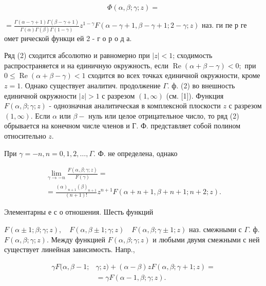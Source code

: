 \documentclass[10pt]{article}
\begin{document}
\[

\Phi(\alpha, \beta ; \gamma ; z)=

\]



$=\frac{\Gamma(\alpha-\gamma+1) \Gamma(\beta-\gamma+1)}{\Gamma(\alpha) \Gamma(\beta) \Gamma(1-\gamma)} z^{1-\gamma} F(\alpha-\gamma+1, \beta-\gamma+1 ; 2-\gamma ; z)$ наз. ги пе р ге омет рической функци ей 2 - г о р о д а.



Ряд (2) сходится абсолютно и равномерно при $|z|<1$; сходимость распространяется и на единичную окружность, если $\operatorname{Re}(\alpha+\beta-\gamma)<0 ;$ при $0 \leqslant \operatorname{Re}(\alpha+\beta-\gamma)<1$ сходится во всех точках единичной окружности, кроме $z=1$. Однако существует аналитич. продолжение $\Gamma$. ф. (2) во внешность единичной окружности $|z|>1$ с разрезом $(1, \infty)$ (см. [1]). Функция $F(\alpha, \beta ; \gamma ; z)$ - однозначная аналитическая в комплексной плоскости $z$ с разрезом $(1, \infty)$. Если $\alpha$ или $\beta-$ нуль или целое отрицательное число, то ряд (2) обрывается на конечном числе членов и Г. Ф. представляет собой полином относительно $z$.



При $\gamma=-n, n=0,1,2, \ldots, \Gamma$. Ф. не определена, однако



\[

\begin{gathered}

\lim _{\gamma \rightarrow-n} \frac{F(\alpha, \beta ; \gamma ; z)}{F(\gamma)}= \\

=\frac{(\alpha)_{n+1}(\beta)_{n+1}}{(n+1) !} z^{n+1} F(\alpha+n+1, \beta+n+1 ; n+2 ; z) .

\end{gathered}

\]



Элементарны е с о отношения. Шесть функций



$F(\alpha \pm 1 ; \beta ; \gamma ; z), \quad F(\alpha, \beta \pm 1 ; \gamma ; z) \quad F(\alpha, \beta ; \gamma \pm 1 ; z)$ наз. смежными с $\Gamma$. ф. $F(\alpha, \beta ; \gamma ; z)$. Между функцией $F(\alpha, \beta ; \gamma ; z)$ и любыми двумя смежными с ней существует линейная зависимость. Напр.,



\[

\begin{aligned}

\gamma F(\alpha, \beta-1 ; & \gamma ; z)+(\alpha-\beta) z F(\alpha, \beta ; \gamma+1 ; z)= \\

& =\gamma F(\alpha-1, \beta ; \gamma ; z) .

\end{aligned}

\]
\end{document}

